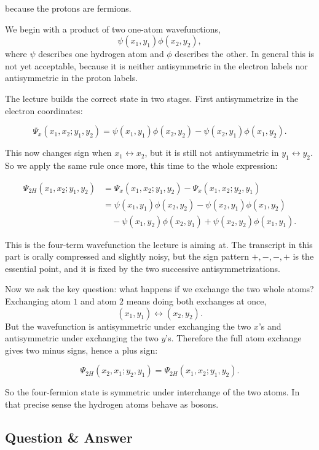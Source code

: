 because the protons are fermions.

We begin with a product of two one-atom wavefunctions,
\[
\psi(x_1,y_1)\phi(x_2,y_2),
\]
where \(\psi\) describes one hydrogen atom and \(\phi\) describes the other. In general this is not yet acceptable, because it is neither antisymmetric in the electron labels nor antisymmetric in the proton labels.

The lecture builds the correct state in two stages. First antisymmetrize in the electron coordinates:

\begin{equation}
\Psi_x(x_1,x_2;y_1,y_2)
=
\psi(x_1,y_1)\phi(x_2,y_2)
-
\psi(x_2,y_1)\phi(x_1,y_2).
\end{equation}

This now changes sign when \(x_1\leftrightarrow x_2\), but it is still not antisymmetric in \(y_1\leftrightarrow y_2\). So we apply the same rule once more, this time to the whole expression:

\begin{align}
\Psi_{2H}(x_1,x_2;y_1,y_2)
&=
\Psi_x(x_1,x_2;y_1,y_2)-\Psi_x(x_1,x_2;y_2,y_1)\\
&=
\psi(x_1,y_1)\phi(x_2,y_2)
-\psi(x_2,y_1)\phi(x_1,y_2)\nonumber\\
&\quad
-\psi(x_1,y_2)\phi(x_2,y_1)
+\psi(x_2,y_2)\phi(x_1,y_1).
\end{align}

This is the four-term wavefunction the lecture is aiming at. The transcript in this part is orally compressed and slightly noisy, but the sign pattern \(+,-,-,+\) is the essential point, and it is fixed by the two successive antisymmetrizations.

Now we ask the key question: what happens if we exchange the two whole atoms? Exchanging atom \(1\) and atom \(2\) means doing both exchanges at once,
\[
(x_1,y_1)\longleftrightarrow(x_2,y_2).
\]
But the wavefunction is antisymmetric under exchanging the two \(x\)'s and antisymmetric under exchanging the two \(y\)'s. Therefore the full atom exchange gives two minus signs, hence a plus sign:

\begin{equation}
\Psi_{2H}(x_2,x_1;y_2,y_1)=\Psi_{2H}(x_1,x_2;y_1,y_2).
\end{equation}

So the four-fermion state is symmetric under interchange of the two atoms. In that precise sense the hydrogen atoms behave as bosons.

\subsection{Question \& Answer}

